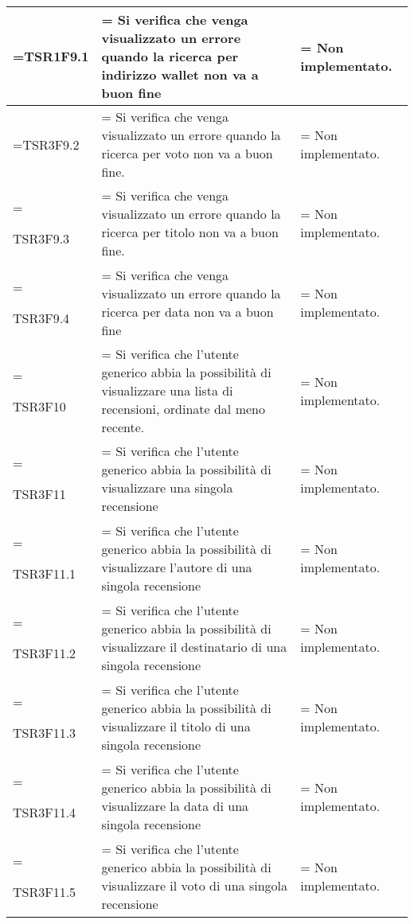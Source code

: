 \begin{xltabular}{\textwidth} {
        >{\hsize\linewidth=\hsize}X
        >{\hsize\linewidth=\hsize}X
        >{\hsize\linewidth=\hsize}X
    }
    TSR1F9.1&
    Si verifica che venga visualizzato un errore quando la ricerca per indirizzo wallet non va a buon fine &
    Non implementato.
    \\ \hline
    
    TSR3F9.2&
    Si verifica che venga visualizzato un errore quando la ricerca per voto non va a buon fine. &
    Non implementato.
    \\ \hline
    
    TSR3F9.3&
    Si verifica che venga visualizzato un errore quando la ricerca per titolo non va a buon fine. &
    Non implementato.
    \\ \hline

    TSR3F9.4&
    Si verifica che venga visualizzato un errore quando la ricerca per data non va a buon fine &
    Non implementato.
    \\ \hline

    TSR3F10 &
    Si verifica che l'utente generico abbia la possibilità di visualizzare una lista di recensioni,
    ordinate dal meno recente.  &
    Non implementato.
    \\ \hline

    TSR3F11 &
    Si verifica che l'utente generico abbia la possibilità di visualizzare una singola recensione  &
    Non implementato.
    \\ \hline

    TSR3F11.1 &
    Si verifica che l'utente generico abbia la possibilità di visualizzare l'autore di una singola recensione  &
    Non implementato.
    \\ \hline

    TSR3F11.2 &
    Si verifica che l'utente generico abbia la possibilità di visualizzare il destinatario di una singola recensione  &
    Non implementato.
    \\ \hline

    TSR3F11.3 &
    Si verifica che l'utente generico abbia la possibilità di visualizzare il titolo di una singola recensione  &
    Non implementato.
    \\ \hline

    TSR3F11.4 &
    Si verifica che l'utente generico abbia la possibilità di visualizzare la data di una singola recensione  &
    Non implementato.
    \\ \hline
    
    TSR3F11.5 &
    Si verifica che l'utente generico abbia la possibilità di visualizzare il voto di una singola recensione  &
    Non implementato.
    \\ \hline


\end{xltabular}
